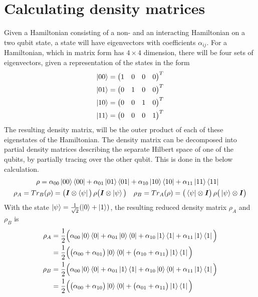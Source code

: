 \section{Calculating density matrices}
Given a Hamiltonian consisting of a non- and an interacting Hamiltonian on a two qubit state, a state will have eigenvectors with coefficients $\alpha_{ij}$. For a Hamiltonian, which in matrix form has $4\times 4$ dimension, there will be four sets of eigenvectors, given a representation of the states in the form
\begin{align}
    \ket{00} = \begin{pmatrix}1& 0 & 0 & 0
    \end{pmatrix}^T \\ 
    \ket{01} = \begin{pmatrix}0& 1 & 0 & 0
    \end{pmatrix}^T \\
    \ket{10} = \begin{pmatrix}0& 0 & 1 & 0
    \end{pmatrix}^T \\
    \ket{11} = \begin{pmatrix}0& 0 & 0 & 1
    \end{pmatrix}^T 
\end{align}
The resulting density matrix, will be the outer product of each of these eigenstates of the Hamiltonian. The density matrix can be decomposed into partial density matrices describing the separate Hilbert space of one of the qubits, by partially tracing over the other qubit. This is done in the below calculation.
\begin{align}
        &\rho = \alpha_{00} \ket{00}\bra{00} + \alpha_{01} \ket{01}\bra{01} + \alpha_{10} \ket{10}\bra{10} + \alpha_{11} \ket{11}\bra{11} \\ 
        \rho_A = T&r_B(\rho)  = \big(\boldsymbol{I}\otimes \bra{\psi}\big)\, \rho \big( \boldsymbol{I}\otimes \ket{\psi}\big) \quad \rho_B = Tr_A(\rho)  = \big(\bra{\psi}\otimes \boldsymbol{I}\big)\, \rho \big(\ket{\psi}\otimes \boldsymbol{I}\big) 
\end{align}
With the state $\ket{\psi} = \frac{1}{\sqrt{2}} (\ket{0} + \ket{1})$, the resulting reduced density matrix $\rho_A$ and $\rho_B$ is
\begin{align}
    \rho_A &= \frac{1}{2} \Big( \alpha_{00} \ket{0}\bra{0} + \alpha_{01} \ket{0}\bra{0} + \alpha_{10} \ket{1}\bra{1} + \alpha_{11} \ket{1}\bra{1}    \Big) \\ 
    &= \frac{1}{2} \Big(\big(\alpha_{00}+\alpha_{01}\big)\ket{0}\bra{0} + \big(\alpha_{10}+\alpha_{11}\big)\ket{1}\bra{1}\Big) \\
    \rho_B &= \frac{1}{2 } \Big( \alpha_{00} \ket{0}\bra{0} + \alpha_{01} \ket{1}\bra{1} + \alpha_{10} \ket{0}\bra{0} + \alpha_{11} \ket{1}\bra{1}\Big)\\
    &= \frac{1}{2} \Big(\big(\alpha_{00}+\alpha_{10}\big)\ket{0}\bra{0} + \big(\alpha_{01}+\alpha_{11}\big)\ket{1}\bra{1}\Big)
\end{align}
